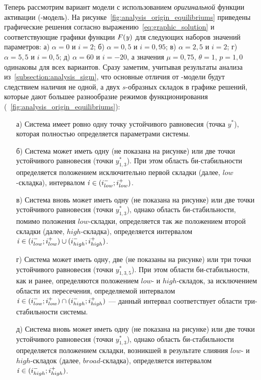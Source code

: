Теперь рассмотрим вариант модели с использованием \textit{оригинальной} функции активации (-модель). На рисунке~\ref{fig:analysis_origin_equilibriums} приведены графические решения согласно выражению~\eqref{eq:graphic_solution} и соответствующие графики функции $F(\mathit{y})$ для следующих наборов значений параметров: а) $\alpha = 0  $ и $i = 2$; б) $\alpha = 0,5$ и $i = 0,95$; в) $\alpha = 2,5$ и $i = 2$; г) $\alpha = 5,5$ и $i = 0,5$; д) $\alpha = 60$ и $i = -20$, а значения  $\mu = 0,75$, $\theta = 1$, $p = 1,0$ одинаковы для всех вариантов. Сразу заметим, учитывая результаты анализа из~\autoref{subsection:analysis_sigm}, что основные отличия от -модели будут следствием наличия не одной, а двух $s$-образных складок в графике решений, которые дают большее разнообразие режимов функционирования (\seefigure~\ref{fig:analysis_origin_equilibriums}):
\begin{itemize}
    \item[а)] Система имеет ровно одну точку устойчивого равновесия (точка $y^{*}$), которая полностью определяется параметрами системы.
    \item[б)] Система может иметь одну (не показана на рисунке) или две точки устойчивого равновесия (точки $y^{*}_{1,3}$). При этом область би-стабильности определяется положением исключительно первой складки (далее, $low$-складка), \ie интервалом $\mathit{i} \in (i_{low}^{-}; i_{low}^{+})$.
    \item[в)] Система вновь может иметь одну (не показана на рисунке) или две точки устойчивого равновесия (точки $y^{*}_{1,3}$), однако область би-стабильности, помимо положения $low$-складки, определяется так же положением второй складки (далее, $high$-складка), \ie определяется интервалом $\mathit{i} \in (i_{low}^{-}; i_{low}^{+}) \cup (i_{high}^{-}; i_{high}^{+})$.
    \item[г)] Система может иметь одну, две (не показаны на рисунке) или три точки устойчивого равновесия (точки $y^{*}_{1,3,5}$). При этом области би-стабильности, как и ранее, определяются положением $low$- и $high$-складок, за исключением области их пересечения, определяемой интервалом $\mathit{i} \in (i_{low}^{-}; i_{low}^{+}) \cap (i_{high}^{-}; i_{high}^{+})$ --- данный интервал соответствует области три-стабильности системы.
    \item[д)] Система вновь может иметь одну (не показана на рисунке) или две точки устойчивого равновесия (точки $y^{*}_{1,3}$), однако область би-стабильности определяется положением складки, возникшей в результате слияния $low$- и $high$-складок (далее, $broad$-складка), \ie определяется интервалом $\mathit{i} \in (i_{high}^{-}; i_{high}^{+})$.
\end{itemize}

